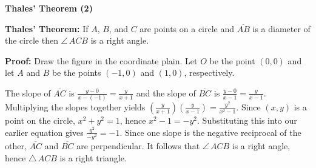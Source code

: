 \documentclass[12pt]{article}
\begin{document}
\begin{center}
\Large{\textbf{Thales' Theorem (2)}}
\end{center}
\textbf{Thales' Theorem:} If $A$, $B$, and $C$ are points on a circle and
$\overline{AB}$ is a diameter of the circle then $\angle \,ACB$ is a right angle.\\

\begin{center}
\end{center}

\noindent\textbf{Proof:} Draw the figure in the coordinate plain. Let $O$ be the point $(0,0)$
and let $A$ and $B$ be the points $(-1,0)$ and $(1,0)$, respectively.
\begin{center}
\end{center}

The slope of $\overline{AC}$ is $\frac{y-0}{x-(-1)}=\frac{y}{x+1}$ and the slope of 
$\overline{BC}$ is $\frac{y-0}{x-1}=\frac{y}{x-1}$. Multiplying the slopes together 
yields $\left(\frac{y}{x+1}\right)\left(\frac{y}{x-1}\right)=\frac{y^2}{x^2-1}$. Since 
$(x,y)$ is a point on the circle, $x^2+y^2=1$, hence $x^2-1=-y^2$. Substituting this into
our earlier equation gives $\frac{y^2}{-y^2}=-1$. Since one slope is the negative reciprocal
of the other, $\overline{AC}$ and $\overline{BC}$ are perpendicular. It follows that 
$\angle \,ACB$ is a right angle, hence $\triangle\, ACB$ is a right triangle.
\end{document}
